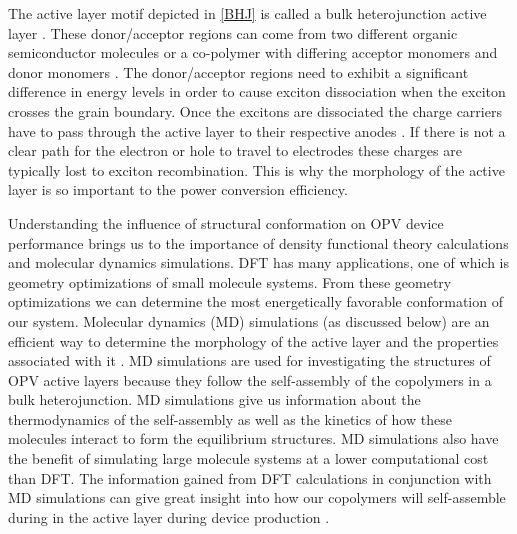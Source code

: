 \par The active layer motif depicted in \autoref{BHJ} is called a bulk heterojunction active layer \citep{gaspar_recent_2018}. These donor/acceptor regions can come from two different organic semiconductor molecules or a co-polymer with differing acceptor monomers and donor monomers \citep{piris_photogeneration_2009}. The donor/acceptor regions need to exhibit a significant difference in energy levels in order to cause exciton dissociation when the exciton crosses the grain boundary. Once the excitons are dissociated the charge carriers have to pass through the active layer to their respective anodes \citep{radford_controlling_2021}. If there is not a clear path for the electron or hole to travel to electrodes these charges are typically lost to exciton recombination. This is why the morphology of the active layer is so important to the power conversion efficiency. 
\par Understanding the influence of structural conformation on OPV device performance brings us to the importance of density functional theory calculations and molecular dynamics simulations. DFT has many applications, one of which is geometry optimizations of small molecule systems. From these geometry optimizations we can determine the most energetically favorable conformation of our system. Molecular dynamics (MD) simulations (as discussed below) are an efficient way to determine the morphology of the active layer and the properties associated with it \citep{chen_fluorination_2022}. MD simulations are used for investigating the structures of OPV active layers because they follow the self-assembly of the copolymers in a bulk heterojunction. MD simulations give us information about the thermodynamics of the self-assembly as well as the kinetics of how these molecules interact to form the equilibrium structures. MD simulations also have the benefit of simulating large molecule systems at a lower computational cost than DFT. The information gained from DFT calculations in conjunction with MD simulations can give great insight into how our copolymers will self-assemble during in the active layer during device production \citep{krebs_all_2009}. 

